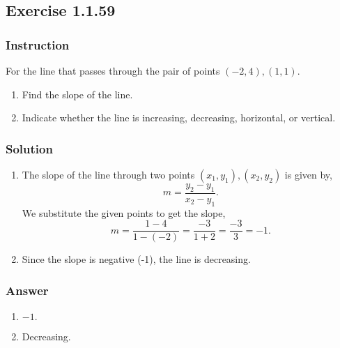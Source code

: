 \subsection*{Exercise 1.1.59}

\subsubsection*{Instruction}

For the line that passes through the pair of points $(-2, 4), (1,1)$.

\begin{enumerate}[label = (\alph*)]
  \item
    Find the slope of the line.
  \item
    Indicate whether the line is increasing, decreasing, horizontal, or vertical.

\end{enumerate}

\subsubsection*{Solution}

\begin{enumerate}[label = (\alph*)]
  \item
    The slope of the line through two points $(x_1, y_1), (x_2, y_2)$ is given by,
    \[ \phantom{.} m = \frac{y_2 - y_1}{x_2 - y_1}. \]
    We substitute the given points to get the slope,
    \[ \phantom{.} m = \frac{1 - 4}{1 - (-2)} = \frac{-3}{1 + 2} = \frac{-3}{3} = -1. \]
  \item
    Since the slope is negative (-1), the line is decreasing.

\end{enumerate}

\subsubsection*{Answer}

\begin{enumerate}[label = (\alph*)]
  \item
    $-1.$
  \item
    Decreasing.
\end{enumerate}
